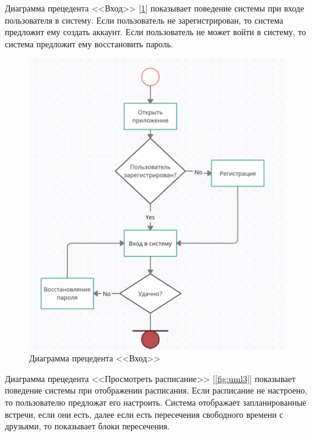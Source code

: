 \documentclass[14pt]{extreport}
\begin{document}
        Диаграмма прецедента <<Вход>> [\ref{fig:uml2}] показывает поведение системы при входе пользователя в систему. Если пользователь не зарегистрирован, то система предложит ему создать аккаунт. Если пользователь не может войти в систему, то система предложит ему восстановить пароль.
        \begin{figure}[h]   
            \centering
            \includegraphics[width=0.94\linewidth]{img/d2.png}
            \caption{ Диаграмма прецедента <<Вход>>}
            \label{fig:uml2}
        \end{figure}
        \newpage 
        Диаграмма прецедента <<Просмотреть расписание>> [\ref{fig:uml3}] показывает поведение системы при отображении расписания. Если расписание не настроено, то пользователю предложат его настроить. Система отображает запланированные встречи, если они есть, далее если есть пересечения свободного времени с друзьями, то показывает блоки пересечения. 
\end{document}
